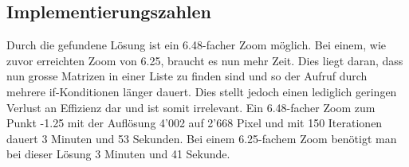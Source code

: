 \subsection{Implementierungszahlen}
Durch die gefundene Lösung ist ein 6.48-facher Zoom möglich. Bei einem, wie zuvor erreichten Zoom von 6.25, braucht es nun mehr Zeit. Dies liegt daran, dass nun grosse Matrizen in einer Liste zu finden sind und so der Aufruf durch mehrere if-Konditionen länger dauert. Dies stellt jedoch einen lediglich geringen Verlust an Effizienz dar und ist somit irrelevant. Ein 6.48-facher Zoom zum Punkt -1.25 mit der Auflösung 4’002 auf 2’668 Pixel und mit 150 Iterationen dauert 3 Minuten und 53 Sekunden. Bei einem 6.25-fachem Zoom benötigt man bei dieser Lösung 3 Minuten und 41 Sekunde.
